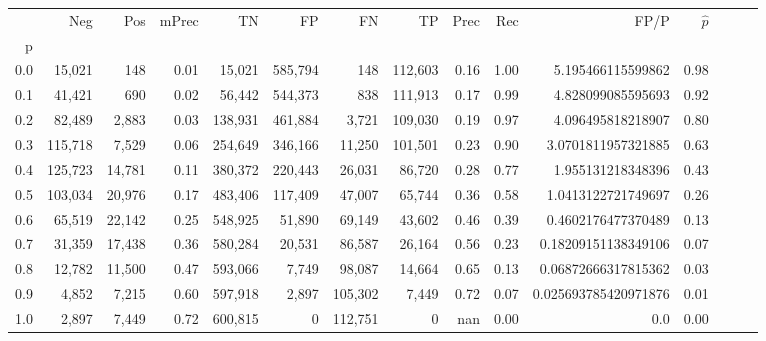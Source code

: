 \begin{tabular}{rrrrrrrrrrrrrrr}
\toprule
{} &      Neg &     Pos & mPrec &       TN &       FP &       FN &       TP &  Prec &   Rec &                  FP/P & $\hat{p}$ \\
p   &          &         &       &          &          &          &          &       &       &                       &           \\
\midrule
0.0 &   15,021 &     148 &  0.01 &   15,021 &  585,794 &      148 &  112,603 &  0.16 &  1.00 &     5.195466115599862 &      0.98 \\
0.1 &   41,421 &     690 &  0.02 &   56,442 &  544,373 &      838 &  111,913 &  0.17 &  0.99 &     4.828099085595693 &      0.92 \\
0.2 &   82,489 &   2,883 &  0.03 &  138,931 &  461,884 &    3,721 &  109,030 &  0.19 &  0.97 &     4.096495818218907 &      0.80 \\
0.3 &  115,718 &   7,529 &  0.06 &  254,649 &  346,166 &   11,250 &  101,501 &  0.23 &  0.90 &    3.0701811957321885 &      0.63 \\
0.4 &  125,723 &  14,781 &  0.11 &  380,372 &  220,443 &   26,031 &   86,720 &  0.28 &  0.77 &     1.955131218348396 &      0.43 \\
0.5 &  103,034 &  20,976 &  0.17 &  483,406 &  117,409 &   47,007 &   65,744 &  0.36 &  0.58 &    1.0413122721749697 &      0.26 \\
0.6 &   65,519 &  22,142 &  0.25 &  548,925 &   51,890 &   69,149 &   43,602 &  0.46 &  0.39 &    0.4602176477370489 &      0.13 \\
0.7 &   31,359 &  17,438 &  0.36 &  580,284 &   20,531 &   86,587 &   26,164 &  0.56 &  0.23 &   0.18209151138349106 &      0.07 \\
0.8 &   12,782 &  11,500 &  0.47 &  593,066 &    7,749 &   98,087 &   14,664 &  0.65 &  0.13 &   0.06872666317815362 &      0.03 \\
0.9 &    4,852 &   7,215 &  0.60 &  597,918 &    2,897 &  105,302 &    7,449 &  0.72 &  0.07 &  0.025693785420971876 &      0.01 \\
1.0 &    2,897 &   7,449 &  0.72 &  600,815 &        0 &  112,751 &        0 &   nan &  0.00 &                   0.0 &      0.00 \\
\bottomrule
\end{tabular}

